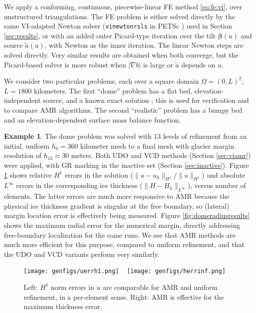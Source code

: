 \documentclass[]{interact}
\theoremstyle{plain}%
\theoremstyle{definition}
\newtheorem{example}[theorem]{Example}
\theoremstyle{remark}
\newcommand{\grad}{\nabla}
\begin{document}
We apply a conforming, continuous, piecewise-linear FE method \eqref{eq:fe:vi}, over unstructured triangulations.  The FE problem is either solved directly by the same VI-adapted Newton solver (\texttt{vinewtonrsls} in PETSc \cite{petsc-user-ref}) used in Section \ref{sec:results}, or with an added outer Picard-type iteration over the tilt $\bm{\beta}(u)$ \cite{JouvetBueler2012} and source $\tilde a(u)$, with Newton as the inner iteration.  The linear Newton steps are solved directly.  Very similar results are obtained when both converge, but the Picard-based solver is more robust when $|\grad b|$ is large or $\tilde a$ depends on $u$.

We consider two particular problems, each over a square domain $\Omega=(0,L)^2$, $L=1800$ kilometers.  The first ``dome'' problem has a flat bed, elevation-independent source, and a known exact solution \cite{Bueler2016}; this is used for verification and to compare AMR algorithms.  The second ``realistic'' problem has a bumpy bed and an elevation-dependent surface mass balance function.

\begin{example} \label{example:dome}
The dome problem was solved with 13 levels of refinement from an initial, uniform $h_0=360$ kilometer mesh to a final mesh with glacier margin resolution of $h_{13}\approx 30$ meters.  Both UDO and VCD methods (Section \ref{sec:viamr}) were applied, with GR marking in the inactive set (Section \ref{sec:inactive}).  Figure \ref{fig:domenormresults} shows relative $H^1$ errors in the solution ($\|u-u_h\|_{H^1}/\|u\|_{H^1}$) and absolute $L^\infty$ errors in the corresponding ice thickness ($\|H-H_h\|_{L^\infty}$), versus number of elements.  The latter errors are much more responsive to AMR because the physical ice thickness gradient is singular at the free boundary, so (lateral) margin location error is effectively being measured.  Figure \ref{fig:domeradiusresults} shows the maximum radial error for the numerical margin, directly addressing free-boundary localization for the same runs.  We see that AMR methods are much more efficient for this purpose, compared to uniform refinement, and that the UDO and VCD variants perform very similarly.
\end{example}

\begin{figure}[ht]
\noindent\mbox{\texttt{[image: genfigs/uerrh1.png]} \, \texttt{[image: genfigs/herrinf.png]}}
\caption{Left: $H^1$ norm errors in $u$ are comparable for AMR and uniform refinement, in a per-element sense.  Right: AMR is effective for the maximum thickness error.}
\label{fig:domenormresults}
\end{figure}
\end{document}
